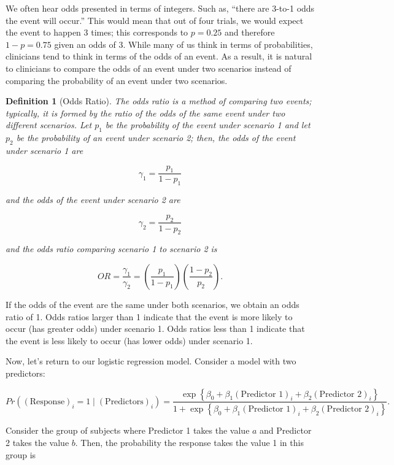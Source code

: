 \documentclass[
]{book}
\theoremstyle{plain}
\theoremstyle{mydefn}
\newtheorem{definition}{Definition}[chapter]
\theoremstyle{myexmpl}
\theoremstyle{remark}
\begin{document}
We often hear odds presented in terms of integers. Such as, ``there are 3-to-1 odds the event will occur.'' This would mean that out of four trials, we would expect the event to happen 3 times; this corresponds to \(p = 0.25\) and therefore \(1 - p = 0.75\) given an odds of 3. While many of us think in terms of probabilities, clinicians tend to think in terms of the odds of an event. As a result, it is natural to clinicians to compare the odds of an event under two scenarios instead of comparing the probability of an event under two scenarios.

\begin{definition}[Odds Ratio]
\protect\hypertarget{def:defn-or}{}{\label{def:defn-or} {} }The odds ratio is a method of comparing two events; typically, it is formed by the ratio of the odds of the same event under two different scenarios. Let \(p_1\) be the probability of the event under scenario 1 and let \(p_2\) be the probability of an event under scenario 2; then, the odds of the event under scenario 1 are

\[\gamma_1 = \frac{p_1}{1 - p_1}\]

and the odds of the event under scenario 2 are

\[\gamma_2 = \frac{p_2}{1 - p_2}\]

and the odds ratio comparing scenario 1 to scenario 2 is

\[OR = \frac{\gamma_1}{\gamma_2} = \left(\frac{p_1}{1 - p_1}\right) \left(\frac{1 - p_2}{p_2}\right).\]
\end{definition}

If the odds of the event are the same under both scenarios, we obtain an odds ratio of 1. Odds ratios larger than 1 indicate that the event is more likely to occur (has greater odds) under scenario 1. Odds ratios less than 1 indicate that the event is less likely to occur (has lower odds) under scenario 1.

Now, let's return to our logistic regression model. Consider a model with two predictors:

\[Pr\left((\text{Response})_i = 1 \mid (\text{Predictors})_i \right) = \frac{\exp\left\{\beta_0 + \beta_1 (\text{Predictor 1})_i + \beta_2 (\text{Predictor 2})_i\right\}}{1 + \exp\left\{\beta_0 + \beta_1 (\text{Predictor 1})_i + \beta_2 (\text{Predictor 2})_i\right\}}.\]

Consider the group of subjects where Predictor 1 takes the value \(a\) and Predictor 2 takes the value \(b\). Then, the probability the response takes the value 1 in this group is
\end{document}
